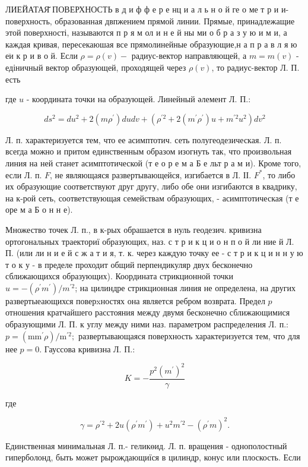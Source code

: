 \documentclass[10pt]{article}
\begin{document}
ЛИЕЙАТАЯ̆ ПОВЕРХНОСТЬ в д и ф ф е р е нц и а л ь н о й ге о ме т р и и- поверхность, образованная двпжением прямой линии. Прямые, принадлежащие этой поверхності, называются п р я м ол и н е й ны ми о б р а з у ю и м и, а каждая кривая, пересекаюшая все прямолинейные образующие,н а п р а в л я ю $е \ddot{и}$ к р и в о й. Если $\rho=\rho(v)-$ радиус-вектор направляющей, а $m=m(v)$ - едіничный вектор образующей, проходящей через $\rho(v)$, то радиус-вектор Л. П. есть



где $u$ - координата точки на образующей. Линейный әлемент Л. П.:



\[

d s^{2}=d u^{2}+2\left(m \rho^{\prime}\right) d u d v+\left(\rho^{\prime 2}+2\left(m^{\prime} \rho^{\prime}\right) u+m^{\prime 2} u^{2}\right) d v^{2}

\]



Л. п. характеризуется тем, что ее асимптотич. сеть полугеодезическая. Л. п. всегда можно и притом единственным образом изогнуть так, что произвольная линия на ней станет асимптотической (т е о р е м а Б е льт р а м и). Кроме того, если Л. п. $F$, не являющаяся развертывающейся, изгибается в Л. ІІ. $F^{*}$, то либо их образующие соответствуют друг другу, либо обе они изгибаются в квадрику, на к-рой сеть, соответствующая семействам образующих, - асимптотическая (т е оре м а Б о н н е).



Множество точек Л. п., в к-рых обрашается в нуль геодезич. кривизна ортогональных траекториї образующих, наз. с т р и к ц и о н п о й ли ние й Л. П. (или ли н и е й с ж а т и я, т. к. через каждую точку ее - с т р и к ц и н н у ю т о к у - в пределе проходит общий перпендикуляр двух бесконечно сближающихся образующих). Координата стрикционной точки $u=-\left(\rho^{\prime} m^{\prime}\right) / m^{\prime 2}$; на цилиндре стрикционная линия не определена, на других развертыеающихся поверxностях она является ребром возврата. Предел $p$ отношения кратчайшего расстояния между двумя бесконечно сближающимися образующими Л. П. к углу между ними наз. параметром распределения Л. п.: $p=\left(\mathrm{mm}^{\prime} \rho\right) / \mathrm{m}^{\prime 2} ;$ развертывающаяся поверхность характеризуется тем, что для нее $p=0$. Гауссова кривизна Л. П.:



\[

K=-\frac{p^{2}\left(m^{\prime}\right)^{2}}{\gamma}

\]



где



\[

\gamma=\rho^{\prime 2}+2 u\left(\rho^{\prime} m^{\prime}\right)+u^{2} m^{\prime 2}-\left(\rho^{\prime} m\right)^{2} .

\]



Единственная минимальная Л. п.- геликөид. Л. п. вращения - однополостный гиперболонд, быть может рырождающиїся в цилиндр, конус или плоскость. Если
\end{document}
